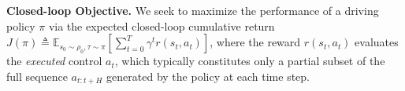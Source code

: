 \documentclass{article}
\begin{document}




\noindent \textbf{Closed-loop Objective.} We seek to maximize the performance of a driving policy $\pi$ via the expected closed-loop cumulative return $J(\pi) \triangleq \mathbb{E}_{s_0 \sim \rho_0, \tau \sim \pi} \left[ \sum_{t=0}^{T} \gamma^{t} r(s_t, a_t) \right]$, where the reward $r(s_t, a_t)$ evaluates the \textit{executed} control $a_t$, which typically constitutes only a partial subset of the full sequence $a_{t:t+H}$ generated by the policy at each time step. 
\end{document}
